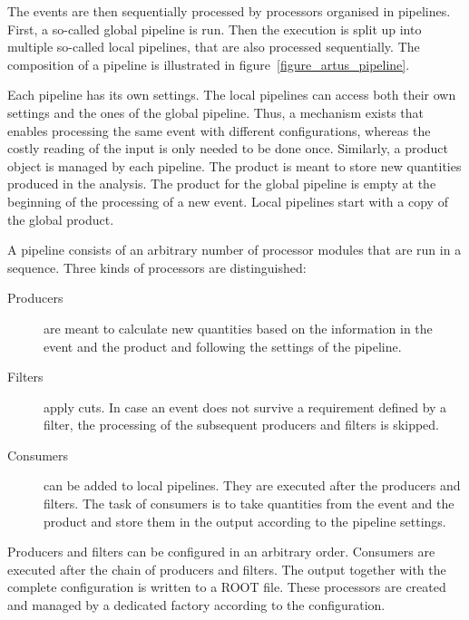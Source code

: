 \documentclass[3p]{elsarticle}
\begin{document}
The events are then sequentially processed by processors organised in pipelines. First, a so-called global pipeline is run. Then the execution is split up into multiple so-called local pipelines, that are also processed sequentially. The composition of a pipeline is illustrated in figure~\ref{figure_artus_pipeline}.

Each pipeline has its own settings. The local pipelines can access both their own settings and the ones of the global pipeline. Thus, a mechanism exists that enables processing the same event with different configurations, whereas the costly reading of the input is only needed to be done once. Similarly, a product object is managed by each pipeline. The product is meant to store new quantities produced in the analysis. The product for the global pipeline is empty at the beginning of the processing of a new event. Local pipelines start with a copy of the global product.

A pipeline consists of an arbitrary number of processor modules that are run in a sequence. Three kinds of processors are distinguished:
\begin{description}
\item[Producers] are meant to calculate new quantities based on the information in the event and the product and following the settings of the pipeline.
\item[Filters] apply cuts. In case an event does not survive a requirement defined by a filter, the processing of the subsequent producers and filters is skipped.
\item[Consumers] can be added to local pipelines. They are executed after the producers and filters. The task of consumers is to take quantities from the event and the product and store them in the output according to the pipeline settings.
\end{description}
Producers and filters can be configured in an arbitrary order. Consumers are executed after the chain of producers and filters. The output together with the complete configuration is written to a ROOT file. These processors are created and managed by a dedicated factory according to the configuration.
\end{document}
